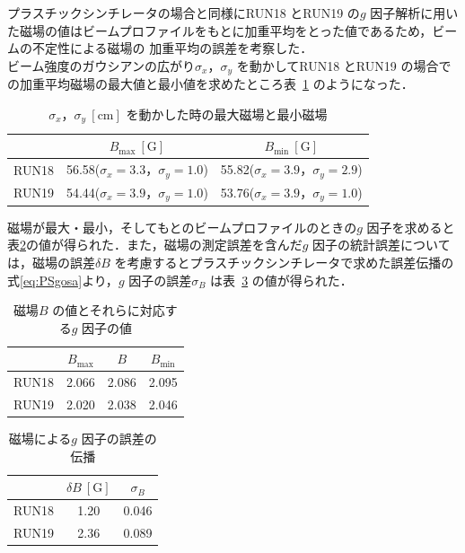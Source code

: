 プラスチックシンチレータの場合と同様にRUN18 とRUN19 の$g$ 因子解析に用いた磁場の値はビームプロファイルをもとに加重平均をとった値であるため，ビームの不定性による磁場の
加重平均の誤差を考察した．\\
ビーム強度のガウシアンの広がり$\sigma_{x}，\sigma_{y}$ を動かしてRUN18 とRUN19 の場合での加重平均磁場の最大値と最小値を求めたところ表~\ref{tab:mag_max_min} のようになった．

\begin{table}[H]
\caption{$\sigma_{x}，\sigma_{y}~[\mathrm{cm}]$ を動かした時の最大磁場と最小磁場}
\centering
\begin{tabular}{ccc}\toprule%
{} & $B_\mathrm{max}~[\mathrm{G}]$ &  $B_\mathrm{min}~[\mathrm{G}]$   \\ \midrule
RUN18 & 56.58\;($\sigma_{x}=3.3，\sigma_{y}=1.0$) & 55.82\;($\sigma_{x}=3.9，\sigma_{y}=2.9$)  \\
RUN19 & 54.44\;($\sigma_{x}=3.9，\sigma_{y}=1.0$) & 53.76\;($\sigma_{x}=3.9，\sigma_{y}=1.0$) \\ \bottomrule
\end{tabular}
\label{tab:mag_max_min}
\end{table}

磁場が最大・最小，そしてもとのビームプロファイルのときの$g$ 因子を求めると表\ref{tab:mag_g}の値が得られた．また，磁場の測定誤差を含んだ$g$ 因子の統計誤差については，磁場の誤差$\delta B$ を考慮するとプラスチックシンチレータで求めた誤差伝播の式\eqref{eq:PSgosa}より，$g$ 因子の誤差$\sigma_{B}$ は表~\ref{tab:g_error} の値が得られた．

\begin{table}[H]
\caption{磁場$B$ の値とそれらに対応する$g$ 因子の値}
\centering
\begin{tabular}{cccc}\toprule%
{} & $B_\mathrm{max}$ & $B$ & $B_\mathrm{min}$  \\ \midrule
RUN18 & 2.066 & 2.086 & 2.095 \\
RUN19 & 2.020 & 2.038 & 2.046 \\ \bottomrule
\end{tabular}
\label{tab:mag_g}
\end{table}

\begin{table}[H]%
\caption{磁場による$g$ 因子の誤差の伝播}
\centering
\begin{tabular}{ccc}\toprule
{} & $\delta B~[\mathrm{G}]$ &  $\sigma_{B}$  \\ \midrule
RUN18 & 1.20 & 0.046  \\
RUN19 & 2.36 & 0.089 \\ \bottomrule
\end{tabular}
\label{tab:g_error}
\end{table}

